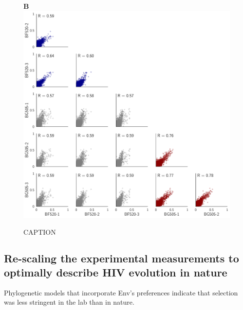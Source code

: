 \documentclass[9pt,lineno]{elife}
\begin{document}
\begin{figure}
\begin{minipage}[t]{0.34\textwidth}
\end{minipage}
\begin{minipage}[t]{0.01\textwidth}
\end{minipage}
\begin{minipage}[t]{0.65\textwidth}
{\bf \Large B} \\
\includegraphics[width=\textwidth]{figures/allprefscorr.pdf}
\end{minipage}
\caption{\label{fig:mutfreqs}
CAPTION
}
\end{figure}
\FloatBarrier



\subsection*{Re-scaling the experimental measurements to optimally describe HIV evolution in nature}

\begin{table}
\begin{fullwidth}
{\centering }
\caption{\label{tab:phydms}
Phylogenetic models that incorporate Env's preferences indicate that selection was less stringent in the lab than in nature.}
\end{fullwidth}
\end{table}
\FloatBarrier
\end{document}
